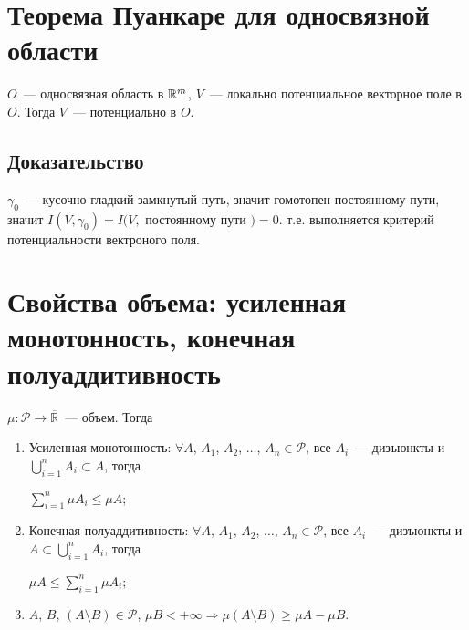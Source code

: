 \documentclass{article}
\begin{document}
    \newpage
    
    \section{Теорема Пуанкаре для односвязной области}
    
        $O$~--- односвязная область в $\mathbb{R}^m$, $V$~--- локально потенциальное векторное поле в $O$. Тогда $V$~--- потенциально в $O$.
        
        \subsection{Доказательство}
        
            $\gamma_0$~--- кусочно-гладкий замкнутый путь, значит гомотопен постоянному пути, значит $I(V, \gamma_0) = I(V,$ постоянному пути $) = 0$. т.е. выполняется критерий потенциальности вектроного поля.
            
    \newpage
    
    \section{Свойства объема: усиленная монотонность, конечная полуаддитивность}
    
        $\mu : \mathcal{P} \rightarrow \overline{\mathbb{R}}$~--- объем. Тогда
        
        \begin{enumerate}
        
            \item Усиленная монотонность: $\forall A$, $A_1$, $A_2$, $\ldots$, $A_n \in \mathcal{P}$, все $A_i$~--- дизъюнкты и $\bigcup\limits^n_{i = 1}A_i \subset A$, тогда
            
                $\sum\limits^n_{i = 1} \mu A_i \leq \mu A$;
                
            \item Конечная полуаддитивность: $\forall A$, $A_1$, $A_2$, $\ldots$, $A_n \in \mathcal{P}$, все $A_i$~--- дизъюнкты и $A \subset \bigcup\limits^n_{i = 1} A_i$, тогда
            
                $\mu A \leq \sum\limits^n_{i = 1} \mu A_i$;
                
            \item $A$, $B$, $\left( A \setminus B \right) \in \mathcal{P}$, $\mu B < +\infty \Rightarrow \mu \left( A \setminus B \right) \geq \mu A - \mu B$.
            
        \end{enumerate}
        
\end{document}

